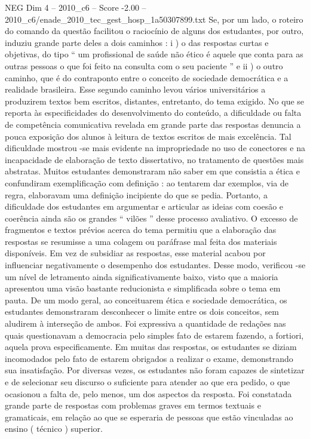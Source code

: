 \begin{textsample}{NEG Dim 4 – 2010\_c6 – Score -2.00 – 2010\_c6/enade\_2010\_tec\_gest\_hosp\_1a50307899.txt}
Se, por um lado, o roteiro do comando da questão facilitou o raciocínio de alguns dos estudantes, por outro, induziu grande parte deles a dois caminhos : i ) o das respostas curtas e objetivas, do tipo “ um profissional de saúde não ético é aquele que conta para as outras pessoas o que foi feito na consulta com o seu paciente ” e ii ) o outro caminho, que é do contraponto entre o conceito de sociedade democrática e a realidade brasileira.
Esse segundo caminho levou vários universitários a produzirem textos bem escritos, distantes, entretanto, do tema exigido.
No que se reporta às especificidades do desenvolvimento do conteúdo, a dificuldade ou falta de competência comunicativa revelada em grande parte das respostas denuncia a pouca exposição dos alunos à leitura de textos escritos de mais excelência.
Tal dificuldade mostrou -se mais evidente na impropriedade no uso de conectores e na incapacidade de elaboração de texto dissertativo, no tratamento de questões mais abstratas.
Muitos estudantes demonstraram não saber em que consistia a ética e confundiram exemplificação com definição : ao tentarem dar exemplos, via de regra, elaboravam uma definição incipiente do que se pedia.
Portanto, a dificuldade dos estudantes em argumentar e articular as ideias com coesão e coerência ainda são os grandes “ vilões ” desse processo avaliativo.
O excesso de fragmentos e textos prévios acerca do tema permitiu que a elaboração das respostas se resumisse a uma colagem ou paráfrase mal feita dos materiais disponíveis.
Em vez de subsidiar as respostas, esse material acabou por influenciar negativamente o desempenho dos estudantes.
Desse modo, verificou -se um nível de letramento ainda significativamente baixo, visto que a maioria apresentou uma visão bastante reducionista e simplificada sobre o tema em pauta.
De um modo geral, ao conceituarem ética e sociedade democrática, os estudantes demonstraram desconhecer o limite entre os dois conceitos, sem aludirem à interseção de ambos.
Foi expressiva a quantidade de redações nas quais questionavam a democracia pelo simples fato de estarem fazendo, a fortiori, aquela prova especificamente.
Em muitas das respostas, os estudantes se diziam incomodados pelo fato de estarem obrigados a realizar o exame, demonstrando sua insatisfação.
Por diversas vezes, os estudantes não foram capazes de sintetizar e de selecionar seu discurso o suficiente para atender ao que era pedido, o que ocasionou a falta de, pelo menos, um dos aspectos da resposta.
Foi constatada grande parte de respostas com problemas graves em termos textuais e gramaticais, em relação ao que se esperaria de pessoas que estão vinculadas ao ensino ( técnico ) superior.

\end{textsample}
